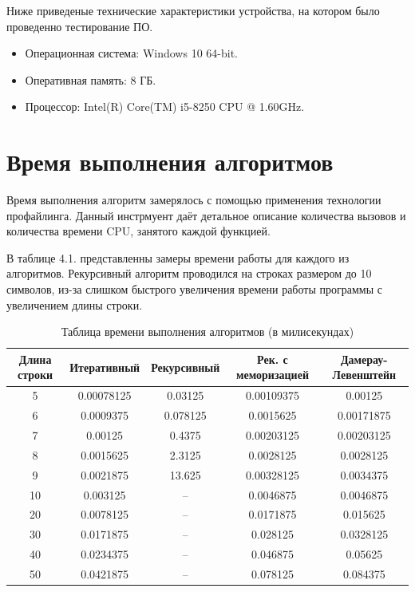 \documentclass[12pt]{report}
\begin{document}
Ниже приведеные технические характеристики устройства, на котором было проведенно тестирование ПО.

\begin{itemize}

	\item Операционная система: Windows 10 64-bit.

	\item Оперативная память: 8 ГБ.

	\item Процессор: Intel(R) Core(TM) i5-8250 CPU @ 1.60GHz.

\end{itemize}

\section{Время выполнения алгоритмов}
Время выполнения алгоритм замерялось с помощью применения технологии профайлинга. Данный инстрмуент даёт детальное описание количества вызовов и количества времени CPU, занятого каждой функцией. \newline

В таблице 4.1. представленны замеры времени работы для каждого из алгоритмов. Рекурсивный алгоритм проводился на строках размером до 10 символов, из-за слишком быстрого увеличения времени работы программы с увеличением длины строки.

\begin{table} [h!]
	\caption{Таблица времени выполнения алгоритмов (в милисекундах)}
	\begin{center}
		\begin{tabular}{|c c c c c|} 
		 	\hline
			Длина строки & Итеративный & Рекурсивный & Рек. с меморизацией & Дамерау-Левенштейн \\
		 	\hline
		 	5 & 0.00078125 & 0.03125 & 0.00109375 & 0.00125\\
		 	6 & 0.0009375 & 0.078125 & 0.0015625 & 0.00171875\\
		 	7 & 0.00125 & 0.4375 & 0.00203125 & 0.00203125\\
		 	8 & 0.0015625 & 2.3125 & 0.0028125 & 0.0028125\\
		 	9 & 0.0021875 & 13.625 & 0.00328125 & 0.0034375\\
		 	10 & 0.003125 & -- & 0.0046875 & 0.0046875\\
		 	20 & 0.0078125 & -- & 0.0171875 & 0.015625 \\
			30 & 0.0171875 & -- & 0.028125 & 0.0328125 \\
			40 & 0.0234375 & -- & 0.046875 & 0.05625 \\
			50 & 0.0421875 & -- & 0.078125 & 0.084375 \\
			\hline
		\end{tabular}
	\end{center}
\end{table}
\end{document}
